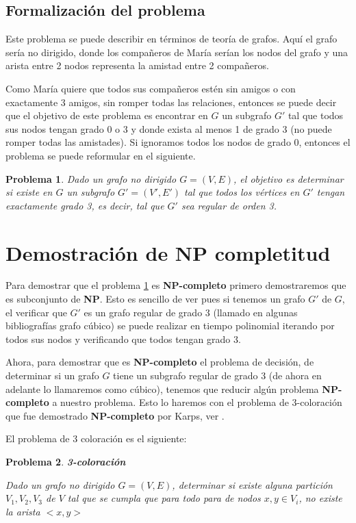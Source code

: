 \documentclass{article}
\newtheorem{problema}{Problema}[section]
\begin{document}
\subsection{Formalización del problema}

Este problema se puede describir en términos de teoría de grafos. Aquí el grafo sería no dirigido,
donde los compañeros de María serían los nodos del grafo y una arista entre 2 nodos representa la
amistad entre 2 compañeros.

Como María quiere que todos sus compañeros estén sin amigos o con exactamente 3 amigos, sin romper todas
las relaciones, entonces se puede decir que el objetivo de este problema es encontrar en $G$ un subgrafo $G'$
tal que todos sus nodos tengan grado 0 o 3 y donde exista al menos 1 de grado 3 (no puede romper todas las amistades).
Si ignoramos todos los nodos de grado 0, entonces el problema se puede reformular en el siguiente.

\begin{problema}\label{prob_1}
 Dado un grafo no dirigido $G = (V, E)$, el objetivo es determinar si existe en $G$ un subgrafo $G' = (V', E')$
 tal que todos los vértices en $G'$ tengan exactamente grado 3, es decir, tal que $G'$ sea regular de orden 3.
\end{problema}

\section{Demostración de NP completitud}

Para demostrar que el problema \ref{prob_1} es \textbf{NP-completo} primero demostraremos que es subconjunto de \textbf{NP}. Esto es sencillo
de ver pues si tenemos un grafo $G'$ de $G$, el verificar que $G'$ es un grafo regular de grado 3 (llamado en algunas bibliografías grafo cúbico)
se puede realizar en tiempo polinomial iterando por todos sus nodos y verificando que todos tengan grado 3.

Ahora, para demostrar que es \textbf{NP-completo} el problema de decisión, de determinar si un grafo $G$ tiene un subgrafo regular de grado 3 (de ahora en adelante lo llamaremos como cúbico),
tenemos que reducir algún problema \textbf{NP-completo} a nuestro problema. Esto lo haremos con el problema de $3$-coloración que fue demostrado
\textbf{NP-completo} por Karps, ver \cite{3-color}.

El problema de 3 coloración es el siguiente:

\begin{problema}\label{prob_2}\textbf{3-coloración}

    Dado un grafo no dirigido $G = (V,E)$, determinar si existe alguna partición $V_1,V_2,V_3$ de $V$ tal que se cumpla que
    para todo para de nodos $x,y\in V_i$, no existe la arista $<x,y>$
\end{problema}
\end{document}
